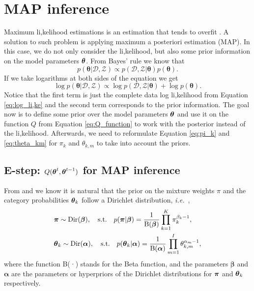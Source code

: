 \documentclass[12pt]{article}
\begin{document}
\section{MAP inference}

Maximum li,kelihood estimations is an estimation that tends to overfit \cite{murphy2012machine}. A solution to such problem is applying maximum a posteriori estimation (MAP). In this case, we do not only consider the li,kelihood, but also some prior information on the model parameters $\boldsymbol\theta$. From Bayes' rule we know that
\begin{equation}
p(\boldsymbol{\theta}|\mathcal{D},\mathcal{Z}) \varpropto p(\mathcal{D},\mathcal{Z}|\boldsymbol{\theta})p(\boldsymbol{\theta}).
\end{equation}
If we take logarithms at both sides of the equation we get
\begin{equation}
\log p(\boldsymbol{\theta}|\mathcal{D},\mathcal{Z}) \varpropto \log p(\mathcal{D},\mathcal{Z}|\boldsymbol{\theta}) + \log p(\boldsymbol{\theta}) .
\end{equation}
Notice that the first term is just the complete data log li,kelihood from Equation \ref{eq:log_li,ke} and the second term corresponds to the prior information. The goal now is to define some prior over the model parameters $\boldsymbol\theta$ and use it on the function $Q$ from Equation \ref{eq:Q_function} to work with the posterior instead of the li,kelihood. Afterwards, we need to reformulate Equation \ref{eq:pi_k} and \ref{eq:theta_km} for $\pi_k$ and $\theta_{k,m}$ to take into account the priors.\\

\subsection{E-step: $Q(\boldsymbol\theta^t, \boldsymbol\theta^{t-1})$ for MAP inference}
\noindent From \cite{notesArtes} and \cite{murphy2012machine} we know it is natural that the prior on the mixture weights $\pi$ and the category probabilities $\boldsymbol\theta_k$ follow a Dirichlet distribution, \textit{i.e.\ },
\begin{align}\label{priors}
& \boldsymbol\pi \sim \text{Dir}(\boldsymbol\beta), \quad \text{s.t.} \quad  p(\boldsymbol\pi |\boldsymbol\beta) = \dfrac{1}{\text{B}(\boldsymbol{\beta})} \prod \limits_{k=1}^{K} \pi_{k}^{\beta_{k}-1}, \\
& \boldsymbol\theta_{k} \sim \text{Dir}(\boldsymbol\alpha), \quad \text{s.t.} \quad p(\boldsymbol\theta_{k}|\boldsymbol\alpha) = \dfrac{1}{\text{B}(\boldsymbol{\alpha})} \prod \limits_{m=1}^{I} \theta_{k,m}^{\alpha_{m}-1},
\end{align}
where the function B(·) stands for the Beta function, and the parameters $\boldsymbol{\beta}$ and $\boldsymbol{\alpha}$ are the parameters or hyperpriors of the Dirichlet distributions for $\boldsymbol\pi$ and $\boldsymbol\theta_{k}$ respectively. \\
\end{document}
